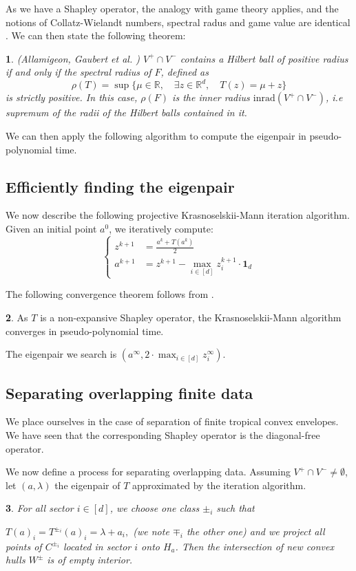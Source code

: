 \documentclass[oneside,english]{amsart}
\numberwithin{equation}{section}
\numberwithin{figure}{section}
\theoremstyle{plain}
\newtheorem{thm}{\protect\theoremname}
\theoremstyle{definition}
\theoremstyle{plain}
\newtheorem{prop}[thm]{\protect\propositionname}
\theoremstyle{remark}
\theoremstyle{plain}
\theoremstyle{definition}
\newtheorem{cor}[thm]{\protect\corollaryname}
\theoremstyle{definition}
\providecommand{\propositionname}{Proposition}
\providecommand{\theoremname}{Theorem}
\providecommand{\corollaryname}{Corollary}
\begin{document}
As we have a Shapley operator, the analogy with game theory applies, and the notions of Collatz-Wielandt numbers, spectral radus and game value are identical \cite{AKIAN2012}. We can then state the following theorem:
\begin{thm}
(Allamigeon, Gaubert et al. \cite{Allamigeon2018}) $V^{+}\cap V^{-}$
contains a Hilbert ball of positive radius if and only if the spectral
radius of $F$, defined as
\[
\rho(T)=\sup\{\mu\in\mathbb{R},\quad\exists z\in\mathbb{R}^{d},\quad T(z)=\mu + z\}
\]
is strictly positive. In this case, $\rho(F)$ is the inner radius
$\text{inrad}(V^{+}\cap V^{-})$, i.e supremum of the radii of the
Hilbert balls contained in it.
\end{thm}

We can then apply the following algorithm to compute the eigenpair
in pseudo-polynomial time.

\subsection{Efficiently finding the eigenpair}

We now describe the following projective Krasnoselskii-Mann iteration
algorithm. Given an initial point
$a^{0}$, we iteratively compute:
\[
\begin{cases}
z^{k+1} & =\frac{a^{k}+T(a^{k})}{2}\\
a^{k+1} & =z^{k+1}-\max_{i\in[d]}z_{i}^{k+1}\cdot\textbf{1}_{d}
\end{cases}
\]

The following convergence theorem follows from \cite{Cominetti2013}.
\begin{cor}
As $T$ is a non-expansive Shapley operator, the Krasnoselskii-Mann
algorithm converges in pseudo-polynomial time.
\end{cor}

The eigenpair we search is $\left(a^{\infty},2\cdot\max_{i\in[d]}z_{i}^{\infty}\right)$.

\subsection{Separating overlapping finite data}
We place ourselves in the case of separation of finite tropical convex envelopes. We have seen that the corresponding Shapley operator is the diagonal-free operator.

We now define a process for separating overlapping data. Assuming
$V^{+}\cap V^{-}\ne\emptyset$, let $\left(a,\lambda\right)$ the
eigenpair of $T$ approximated by the iteration algorithm.
\begin{prop}
For all sector $i \in [d]$, we choose one class $\pm_i$ such that 

$T(a)_i = T^{\pm_i}(a)_i = \lambda + a_i,$ (we note $\mp_i$ the other one)  and we project all points of $C^{\pm_i}$ located in sector $i$ onto $H_{a}$. Then the intersection
of new convex hulls $W^{\pm}$ is of empty interior.
\end{prop}
\end{document}
